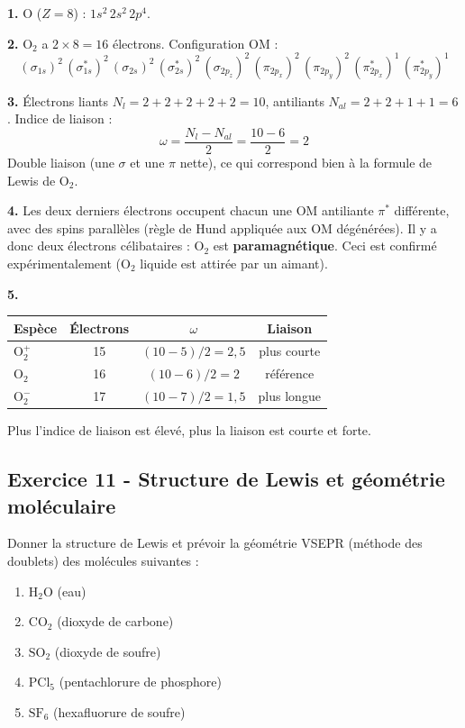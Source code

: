 \documentclass[12pt,a4paper]{article}
\begin{document}
\begin{boitecorrige}
\textbf{1.} $\text{O}$ ($Z=8$) : $1s^2\,2s^2\,2p^4$.

\textbf{2.} O$_2$ a $2\times8=16$ électrons. Configuration OM :
\[
(\sigma_{1s})^2\,(\sigma^*_{1s})^2\,(\sigma_{2s})^2\,(\sigma^*_{2s})^2\,(\sigma_{2p_z})^2\,(\pi_{2p_x})^2\,(\pi_{2p_y})^2\,(\pi^*_{2p_x})^1\,(\pi^*_{2p_y})^1
\]

\textbf{3.} Électrons liants $N_l = 2+2+2+2+2 = 10$, antiliants $N_{al} = 2+2+1+1 = 6$. Indice de liaison :
\[
\omega = \frac{N_l - N_{al}}{2} = \frac{10-6}{2} = 2
\]
Double liaison (une $\sigma$ et une $\pi$ nette), ce qui correspond bien à la formule de Lewis de O$_2$.

\textbf{4.} Les deux derniers électrons occupent chacun une OM antiliante $\pi^*$ différente, avec des spins parallèles (règle de Hund appliquée aux OM dégénérées). Il y a donc deux électrons célibataires : O$_2$ est \textbf{paramagnétique}. Ceci est confirmé expérimentalement (O$_2$ liquide est attirée par un aimant).

\textbf{5.}
\begin{center}
\begin{tabular}{lccc}
\toprule
Espèce & Électrons & $\omega$ & Liaison\\
\midrule
$\text{O}_2^+$ & 15 & $(10-5)/2 = 2{,}5$ & plus courte\\
$\text{O}_2$ & 16 & $(10-6)/2 = 2$ & référence\\
$\text{O}_2^-$ & 17 & $(10-7)/2 = 1{,}5$ & plus longue\\
\bottomrule
\end{tabular}
\end{center}
Plus l'indice de liaison est élevé, plus la liaison est courte et forte.
\end{boitecorrige}

\subsection*{Exercice 11 - Structure de Lewis et géométrie moléculaire \niveau{\moyen}}

\begin{boiteexercice}
Donner la structure de Lewis et prévoir la géométrie VSEPR (méthode des doublets) des molécules suivantes :
\begin{enumerate}[label=(\alph*)]
  \item $\text{H}_2\text{O}$ (eau)
  \item $\text{CO}_2$ (dioxyde de carbone)
  \item $\text{SO}_2$ (dioxyde de soufre)
  \item $\text{PCl}_5$ (pentachlorure de phosphore)
  \item $\text{SF}_6$ (hexafluorure de soufre)
\end{enumerate}
\end{boiteexercice}
\end{document}
